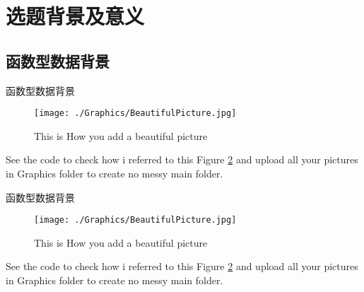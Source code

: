 \documentclass[aspectratio=169, 9pt]{beamer}
\begin{document}
\section{选题背景及意义}
\subsection{函数型数据背景}
\begin{frame}{函数型数据背景}
        \begin{minipage}[t]{\linewidth}
            \begin{center}
            \begin{figure}
                \centering
                \texttt{[image: ./Graphics/BeautifulPicture.jpg]}
             \caption{This is How you add a beautiful picture}
                \label{BFigure1} %
            \end{figure}
            \end{center}
        \end{minipage}
        See the code to check how i referred to this Figure \ref{BFigure1} and upload all your pictures in Graphics folder to create no messy main folder.
\end{frame}
\begin{frame}{函数型数据背景}
        \begin{minipage}[t]{\linewidth}
            \begin{center}
            \begin{figure}
                \centering
                \texttt{[image: ./Graphics/BeautifulPicture.jpg]}
             \caption{This is How you add a beautiful picture}
                \label{BFigure1} %
            \end{figure}
            \end{center}
        \end{minipage}
        See the code to check how i referred to this Figure \ref{BFigure1} and upload all your pictures in Graphics folder to create no messy main folder.
\end{frame}
\end{document}
